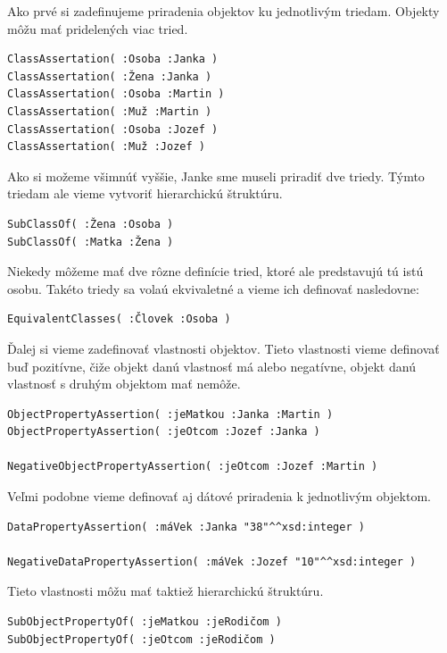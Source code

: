 \documentclass[12pt, a4paper, oneside]{book}
\begin{document}

Ako prvé si zadefinujeme priradenia objektov ku jednotlivým triedam. Objekty môžu mať pridelených viac tried.
\begin{verbatim}
ClassAssertation( :Osoba :Janka )
ClassAssertation( :Žena :Janka )
ClassAssertation( :Osoba :Martin )
ClassAssertation( :Muž :Martin )
ClassAssertation( :Osoba :Jozef )
ClassAssertation( :Muž :Jozef )
\end{verbatim}


Ako si možeme všimnúť vyššie, Janke sme museli priradiť dve triedy. Týmto triedam ale vieme vytvoriť hierarchickú štruktúru.
\begin{verbatim}
SubClassOf( :Žena :Osoba )
SubClassOf( :Matka :Žena )
\end{verbatim}


Niekedy môžeme mať dve rôzne definície tried, ktoré ale predstavujú tú istú osobu. Takéto triedy sa volaú ekvivaletné a vieme ich definovať nasledovne:
\begin{verbatim}
EquivalentClasses( :Človek :Osoba )
\end{verbatim}



Ďalej si vieme zadefinovať vlastnosti objektov. Tieto vlastnosti vieme definovať buď pozitívne, čiže objekt danú vlastnosť má alebo negatívne, objekt danú vlastnosť s druhým objektom mať nemôže.
\begin{verbatim}
ObjectPropertyAssertion( :jeMatkou :Janka :Martin )
ObjectPropertyAssertion( :jeOtcom :Jozef :Janka )

NegativeObjectPropertyAssertion( :jeOtcom :Jozef :Martin )
\end{verbatim}


Veľmi podobne vieme definovať aj dátové priradenia k jednotlivým objektom.
\begin{verbatim}
DataPropertyAssertion( :máVek :Janka "38"^^xsd:integer )

NegativeDataPropertyAssertion( :máVek :Jozef "10"^^xsd:integer )
\end{verbatim}


Tieto vlastnosti môžu mať taktiež hierarchickú štruktúru.
\begin{verbatim}
SubObjectPropertyOf( :jeMatkou :jeRodičom )
SubObjectPropertyOf( :jeOtcom :jeRodičom )
\end{verbatim}
\end{document}

